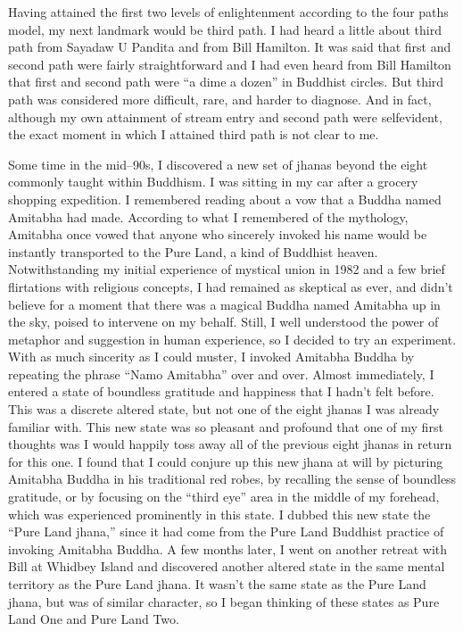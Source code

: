 \documentclass[a5paper,10pt,english]{book}
\begin{document}
\sphinxAtStartPar
Having attained the first two levels of enlightenment according to the
four paths model, my next landmark would be third path. I had heard a
little about third path from Sayadaw U Pandita and from Bill Hamilton.
It was said that first and second path were fairly straightforward and I
had even heard from Bill Hamilton that first and second path were “a
dime a dozen” in Buddhist circles. But third path was considered more
difficult, rare, and harder to diagnose. And in fact, although my own
attainment of stream entry and second path were self\sphinxhyphen{}evident, the exact
moment in which I attained third path is not clear to me.

\sphinxAtStartPar
Some time in the mid–90s, I discovered a new set of jhanas beyond the
eight commonly taught within Buddhism. I was sitting in my car after a
grocery shopping expedition. I remembered reading about a vow that a
Buddha named Amitabha had made. According to what I remembered of the
mythology, Amitabha once vowed that anyone who sincerely invoked his
name would be instantly transported to the Pure Land, a kind of Buddhist
heaven. Notwithstanding my initial experience of mystical union in 1982
and a few brief flirtations with religious concepts, I had remained as
skeptical as ever, and didn’t believe for a moment that there was a
magical Buddha named Amitabha up in the sky, poised to intervene on my
behalf. Still, I well understood the power of metaphor and suggestion in
human experience, so I decided to try an experiment. With as much
sincerity as I could muster, I invoked Amitabha Buddha by repeating the
phrase “Namo Amitabha” over and over. Almost immediately, I entered a
state of boundless gratitude and happiness that I hadn’t felt before.
This was a discrete altered state, but not one of the eight jhanas I was
already familiar with. This new state was so pleasant and profound that
one of my first thoughts was I would happily toss away all of the
previous eight jhanas in return for this one. I found that I could
conjure up this new jhana at will by picturing Amitabha Buddha in his
traditional red robes, by recalling the sense of boundless gratitude, or
by focusing on the “third eye” area in the middle of my forehead, which
was experienced prominently in this state. I dubbed this new state the
“Pure Land jhana,” since it had come from the Pure Land Buddhist
practice of invoking Amitabha Buddha. A few months later, I went on
another retreat with Bill at Whidbey Island and discovered another
altered state in the same mental territory as the Pure Land jhana. It
wasn’t the same state as the Pure Land jhana, but was of similar
character, so I began thinking of these states as Pure Land One and Pure
Land Two.
\end{document}
